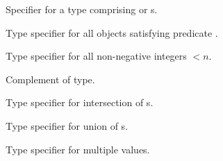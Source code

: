 \begin{LIST}{1cm}
  {
  Specifier for a type comprising  or s.
  }

  {
  Type specifier for all objects satisfying predicate . 
  }

  {
  Type specifier for all non-negative integers $<n$.
  }

  {
  Complement of type.
  }

  {
  Type specifier for intersection of s.
  }

  {
  Type specifier for union of s.
  }

  {
  Type specifier for multiple values.
  }

  \end{LIST}



